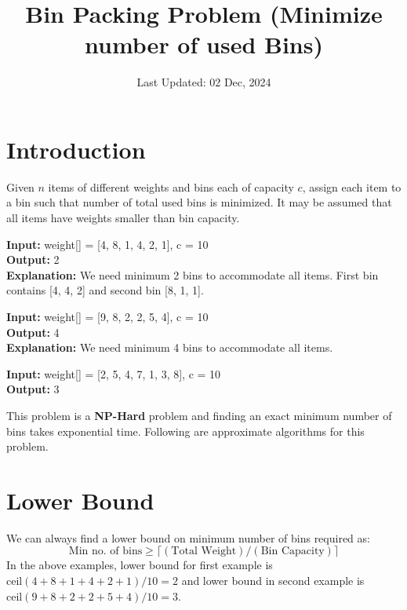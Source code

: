 \documentclass[runningheads]{llncs}
\begin{document}
\title{Bin Packing Problem (Minimize number of used Bins)}
\author{Last Updated: 02 Dec, 2024}
\institute{}
\maketitle

\section{Introduction}
Given $n$ items of different weights and bins each of capacity $c$, assign each item to a bin such that number of total used bins is minimized. It may be assumed that all items have weights smaller than bin capacity.



\begin{tcolorbox}[BoxDarkBlue, title=\faIcon{list} Examples, fonttitle=\bfseries]
\textbf{Input:} weight[] = [4, 8, 1, 4, 2, 1], c = 10 \\
\textbf{Output:} 2 \\
\textbf{Explanation:} We need minimum 2 bins to accommodate all items. First bin contains [4, 4, 2] and second bin [8, 1, 1].

\vspace{2mm}
\textbf{Input:} weight[] = [9, 8, 2, 2, 5, 4], c = 10 \\
\textbf{Output:} 4 \\
\textbf{Explanation:} We need minimum 4 bins to accommodate all items.

\vspace{2mm}
\textbf{Input:} weight[] = [2, 5, 4, 7, 1, 3, 8], c = 10 \\
\textbf{Output:} 3
\end{tcolorbox}

This problem is a \textbf{NP-Hard} problem and finding an exact minimum number of bins takes exponential time. Following are approximate algorithms for this problem.

\section{Lower Bound}
We can always find a lower bound on minimum number of bins required as: 
\[ \text{Min no. of bins} \geq \lceil (\text{Total Weight}) / (\text{Bin Capacity}) \rceil \]
In the above examples, lower bound for first example is $\text{ceil}(4 + 8 + 1 + 4 + 2 + 1)/10 = 2$ and lower bound in second example is $\text{ceil}(9 + 8 + 2 + 2 + 5 + 4)/10 = 3$.
\end{document}
